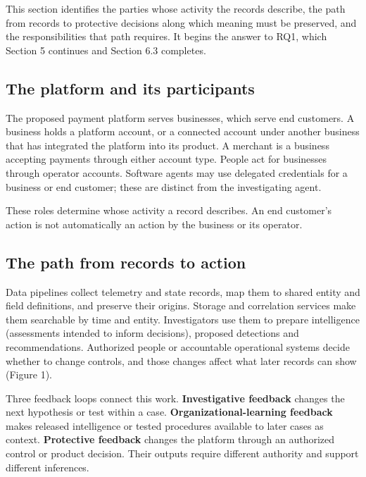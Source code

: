 \documentclass[acmlarge,nonacm]{acmart}
\begin{document}
This section identifies the parties whose activity the records describe,
the path from records to protective decisions along which meaning must
be preserved, and the responsibilities that path requires. It begins the
answer to RQ1, which Section 5 continues and Section 6.3 completes.

\hypertarget{the-platform-and-its-participants}{%
\subsection{The platform and its
participants}\label{the-platform-and-its-participants}}

The proposed payment platform serves businesses, which serve end
customers. A business holds a platform account, or a connected account
under another business that has integrated the platform into its
product. A merchant is a business accepting payments through either
account type. People act for businesses through operator accounts.
Software agents may use delegated credentials for a business or end
customer; these are distinct from the investigating agent.

These roles determine whose activity a record describes. An end
customer's action is not automatically an action by the business or its
operator.

\hypertarget{the-path-from-records-to-action}{%
\subsection{The path from records to
action}\label{the-path-from-records-to-action}}

Data pipelines collect telemetry and state records, map them to shared
entity and field definitions, and preserve their origins. Storage and
correlation services make them searchable by time and entity.
Investigators use them to prepare intelligence (assessments intended to
inform decisions), proposed detections and recommendations. Authorized
people or accountable operational systems decide whether to change
controls, and those changes affect what later records can show (Figure
1).

Three feedback loops connect this work. \textbf{Investigative feedback}
changes the next hypothesis or test within a case.
\textbf{Organizational-learning feedback} makes released intelligence or
tested procedures available to later cases as context.
\textbf{Protective feedback} changes the platform through an authorized
control or product decision. Their outputs require different authority
and support different inferences.
\end{document}

